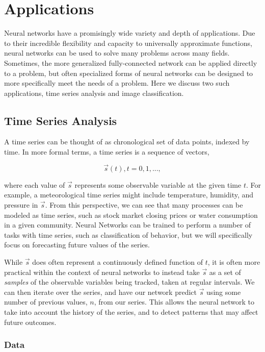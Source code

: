 \documentclass[a4paper, 11pt]{article} %
\begin{document}
\section*{Applications}

Neural networks have a promisingly wide variety and depth of applications.  Due to their incredible flexibility and capacity to universally approximate functions, neural networks can be used to solve many problems across many fields.  Sometimes, the more generalized fully-connected network can be applied directly to a problem, but often specialized forms of neural networks can be designed to more specifically meet the needs of a problem.  Here we discuss two such applications, time series analysis and image classification.

\subsection*{Time Series Analysis}

A time series can be thought of as chronological set of data points, indexed by time.  In more formal terms, a time series is a sequence of vectors,

\begin{equation}
\vec{s}(t), t = 0, 1,...,
\end{equation}

where each value of $\vec{s}$ represents some observable variable at the given time $t$.  For example, a meteorological time series might include temperature, humidity, and pressure in $\vec{s}$.  From this perspective, we can see that many processes can be modeled as time series, such as stock market closing prices or water consumption in a given community.  Neural Networks can be trained to perform a number of tasks with time series, such as classification of behavior, but we will specifically focus on forecasting future values of the series.

While $\vec{s}$ does often represent a continuously defined function of $t$, it is often more practical within the context of neural networks to instead take $\vec{s}$ as a set of \textit{samples} of the observable variables being tracked, taken at regular intervals.  We can then iterate over the series, and have our network predict $\vec{s}$ using some number of previous values, $n$, from our series.  This allows the neural network to take into account the history of the series, and to detect patterns that may affect future outcomes.

\subsubsection*{Data}
\end{document}
